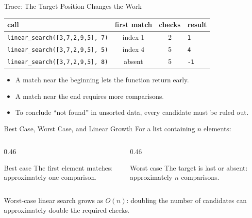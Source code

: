 \documentclass[aspectratio=169,10pt]{beamer}
\begin{document}
\begin{frame}{Trace: The Target Position Changes the Work}
  \begin{center}
    \renewcommand{\arraystretch}{1.24}
    \begin{tabular}{l|c|c|l}
      \textbf{call} & \textbf{first match} & \textbf{checks} & \textbf{result} \\\hline
      \texttt{linear\_search([3,7,2,9,5], 7)} & index 1 & 2 & \texttt{1} \\
      \texttt{linear\_search([3,7,2,9,5], 5)} & index 4 & 5 & \texttt{4} \\
      \texttt{linear\_search([3,7,2,9,5], 8)} & absent & 5 & \texttt{-1}
    \end{tabular}
  \end{center}

  \begin{itemize}
    \item A match near the beginning lets the function return early.
    \item A match near the end requires more comparisons.
    \item To conclude ``not found'' in unsorted data, every candidate must be ruled out.
  \end{itemize}
\end{frame}

\begin{frame}{Best Case, Worst Case, and Linear Growth}
  For a list containing $n$ elements:

  \begin{columns}[T,onlytextwidth]
    \begin{column}{0.46\textwidth}
      \begin{block}{Best case}
        The first element matches: approximately one comparison.
      \end{block}
    \end{column}
    \begin{column}{0.46\textwidth}
      \begin{block}{Worst case}
        The target is last or absent: approximately $n$ comparisons.
      \end{block}
    \end{column}
  \end{columns}

  \begin{keyidea}
    Worst-case linear search grows as $O(n)$: doubling the number of candidates can approximately double the required checks.
  \end{keyidea}
\end{frame}
\end{document}
